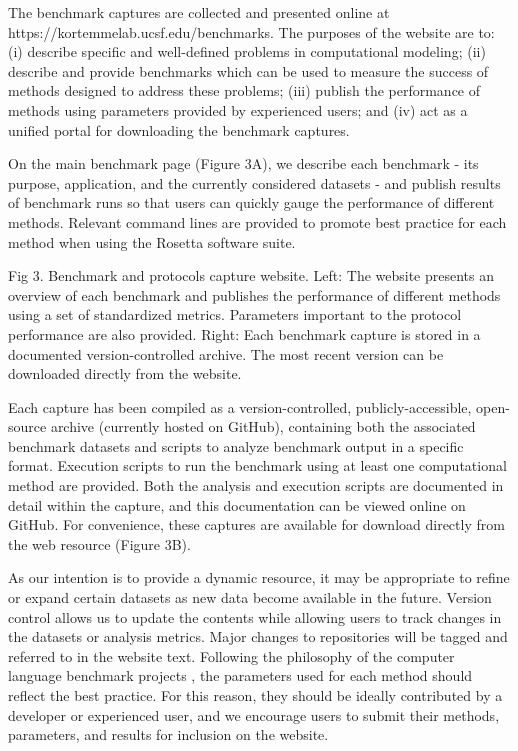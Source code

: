 The benchmark captures are collected and presented online at  https://kortemmelab.ucsf.edu/benchmarks. The purposes of the website are to: (i) describe specific and well-defined problems in computational modeling; (ii) describe and provide benchmarks which can be used to measure the success of methods designed to address these problems; (iii) publish the performance of methods using parameters provided by experienced users; and (iv) act as a unified portal for downloading the benchmark captures.

On the main benchmark page (Figure 3A), we describe each benchmark - its purpose, application, and the currently considered datasets - and publish results of benchmark runs so that users can quickly gauge the performance of different methods. Relevant command lines are provided to promote best practice for each method when using the Rosetta software suite.

Fig 3. Benchmark and protocols capture website.
Left: The website presents an overview of each benchmark and publishes the performance of different methods using a set of standardized metrics. Parameters important to the protocol performance are also provided. Right: Each benchmark capture is stored in a documented version-controlled archive. The most recent version can be downloaded directly from the website.


Each capture has been compiled as a version-controlled, publicly-accessible, open-source archive (currently hosted on GitHub), containing both the associated benchmark datasets and scripts to analyze benchmark output in a specific format. Execution scripts to run the benchmark using at least one computational method are provided. Both the analysis and execution scripts are documented in detail within the capture, and this documentation can be viewed online on GitHub. For convenience, these captures are available for download directly from the web resource (Figure 3B).

As our intention is to provide a dynamic resource, it may be appropriate to refine or expand certain datasets as new data become available in the future. Version control allows us to update the contents while allowing users to track changes in the datasets or analysis metrics. Major changes to repositories will be tagged and referred to in the website text. Following the philosophy of the computer language benchmark projects \cite{bagley_d_computer_2004,calpini_a_great_2003}, the parameters used for each method should reflect the best practice. For this reason, they should be ideally contributed by a developer or experienced user, and we encourage users to submit their methods, parameters, and results for inclusion on the website.

